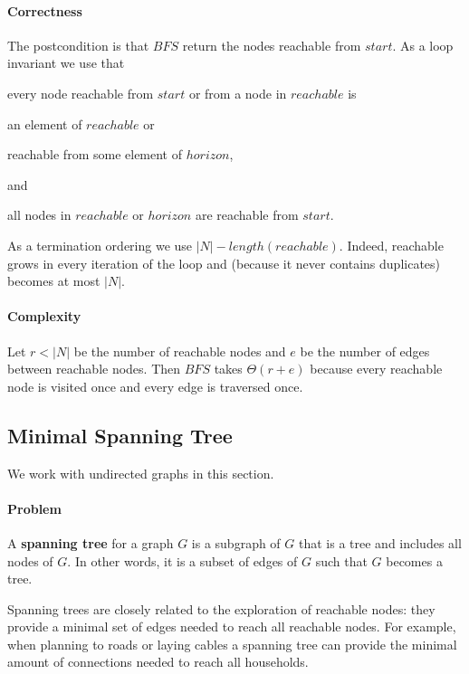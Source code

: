 \paragraph{Correctness}
The postcondition is that $BFS$ return the nodes reachable from $start$.
As a loop invariant we use that
\begin{compactitem}
 \item every node reachable from $start$ or from a node in $reachable$ is
		\begin{compactitem}
		 \item an element of $reachable$ or
		 \item reachable from some element of $horizon$,
		\end{compactitem}
	and
 \item all nodes in $reachable$ or $horizon$ are reachable from $start$.
\end{compactitem}

As a termination ordering we use $|N|-length(reachable)$.
Indeed, reachable grows in every iteration of the loop and (because it never contains duplicates) becomes at most $|N|$.

\paragraph{Complexity}
Let $r<|N|$ be the number of reachable nodes and $e$ be the number of edges between reachable nodes.
Then $BFS$ takes $\Theta(r+e)$ because every reachable node is visited once and every edge is traversed once.

\subsection{Minimal Spanning Tree}\label{sec:ad:spanningtree}

We work with undirected graphs in this section.

\paragraph{Problem}
A \textbf{spanning tree} for a graph $G$ is a subgraph of $G$ that is a tree and includes all nodes of $G$.
In other words, it is a subset of edges of $G$ such that $G$ becomes a tree.

Spanning trees are closely related to the exploration of reachable nodes: they provide a minimal set of edges needed to reach all reachable nodes.
For example, when planning to roads or laying cables a spanning tree can provide the minimal amount of connections needed to reach all households.

